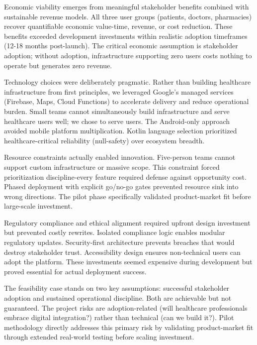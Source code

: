 \documentclass[12pt,a4paper]{report}
\begin{document}
Economic viability emerges from meaningful stakeholder benefits combined with sustainable revenue models. All three user groups (patients, doctors, pharmacies) recover quantifiable economic value-time, revenue, or cost reduction. These benefits exceeded development investments within realistic adoption timeframes (12-18 months post-launch). The critical economic assumption is stakeholder adoption; without adoption, infrastructure supporting zero users costs nothing to operate but generates zero revenue.

Technology choices were deliberately pragmatic. Rather than building healthcare infrastructure from first principles, we leveraged Google's managed services (Firebase, Maps, Cloud Functions) to accelerate delivery and reduce operational burden. Small teams cannot simultaneously build infrastructure and serve healthcare users well; we chose to serve users. The Android-only approach avoided mobile platform multiplication. Kotlin language selection prioritized healthcare-critical reliability (null-safety) over ecosystem breadth.

Resource constraints actually enabled innovation. Five-person teams cannot support custom infrastructure or massive scope. This constraint forced prioritization discipline-every feature required defense against opportunity cost. Phased deployment with explicit go/no-go gates prevented resource sink into wrong directions. The pilot phase specifically validated product-market fit before large-scale investment.

Regulatory compliance and ethical alignment required upfront design investment but prevented costly rewrites. Isolated compliance logic enables modular regulatory updates. Security-first architecture prevents breaches that would destroy stakeholder trust. Accessibility design ensures non-technical users can adopt the platform. These investments seemed expensive during development but proved essential for actual deployment success.

The feasibility case stands on two key assumptions: successful stakeholder adoption and sustained operational discipline. Both are achievable but not guaranteed. The project risks are adoption-related (will healthcare professionals embrace digital integration?) rather than technical (can we build it?). Pilot methodology directly addresses this primary risk by validating product-market fit through extended real-world testing before scaling investment.
\end{document}
